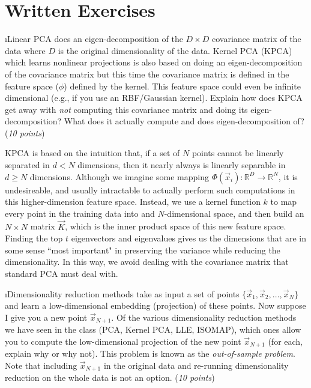 \documentclass[fleqn]{article}
\begin{document}

\section{Written Exercises}

\bee

\i Linear PCA does an eigen-decomposition of the $D\times D$ covariance
matrix of the data where $D$ is the original dimensionality of the data.
Kernel PCA (KPCA) which learns nonlinear projections is also based on doing an
eigen-decomposition of the covariance matrix but this time the covariance
matrix is defined in the feature space ($\phi$) defined by the kernel. This 
feature space could even be infinite dimensional (e.g., if you use an 
RBF/Gaussian kernel). Explain how does KPCA get away with \emph{not} computing
this covariance matrix and doing its eigen-decomposition? What does it
actually compute and does eigen-decomposition of? (\emph{10 points})

\begin{solution}
KPCA is based on the intuition that, if a set of $N$ points cannot be linearly separated in $d < N$ dimensions, then it nearly always is linearly separable in $d \ge N$ dimensions. Although we imagine some mapping $\Phi (\vec{x}_i) : \mathbb{R}^D \rightarrow \mathbb{R}^N$, it is undesireable, and usually intractable to actually perform such computations in this higher-dimension feature space. Instead, we use a kernel function $k$ to map every point in the training data into and $N$-dimensional space, and then build an $N \times N$ matrix $\vec{K}$, which is the inner product space of this new feature space. Finding the top $t$ eigenvectors and eigenvalues gives us the dimensions that are in some sense ``most important" in preserving the variance while reducing the dimensionality. In this way, we avoid dealing with the covariance matrix that standard PCA must deal with.
\end{solution}

\i Dimensionality reduction methods take as input a set of points
$\{\vec{x}_1,\vec{x}_2,\ldots,\vec{x}_N\}$ and learn a low-dimensional
embedding (projection) of these points. Now suppose I give you a new point
$\vec{x}_{N+1}$. Of the various dimensionality reduction methods we 
have seen in the class (PCA, Kernel PCA, LLE, ISOMAP), which ones 
allow you to compute the low-dimensional projection of the new point
$\vec{x}_{N+1}$ (for each, explain why or why not). This problem is known
as the \emph{out-of-sample problem}. Note that including $\vec{x}_{N+1}$ in the original
data and re-running dimensionality reduction on the whole data is not an option.
(\emph{10 points})
\end{document}
